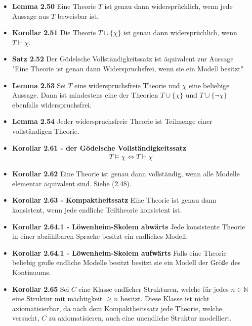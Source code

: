 \documentclass{scrartcl}
\renewcommand{\models}[0]{\vDash}
\begin{document}
\begin{itemize}
    \item \textbf{Lemma 2.50} Eine Theorie $T$ ist genau dann widersprüchlich, wenn jede Aussage aus $T$ beweisbar ist.
    \item \textbf{Korollar 2.51} Die Theorie $T \cup \{\chi\}$ ist genau dann widersprüchlich, wenn $T \vdash \chi$.
    \item \textbf{Satz 2.52} Der Gödelsche Vollständigkeitssatz ist äquivalent zur Aussage "Eine Theorie ist genau dann Widerspruchsfrei, wenn sie ein Modell besitzt"
    \item \textbf{Lemma 2.53} Sei $T$ eine widerspruchsfreie Theorie und $\chi$ eine beliebige Aussage. Dann ist mindestens eine der Theorien $T \cup \{\chi\}$ und $T \cup \{\neg \chi\}$ ebenfalls widerspruchsfrei.
    \item \textbf{Lemma 2.54} Jeder widerspruchsfreie Theorie ist Teilmenge einer vollständigen Theorie.
    \item \textbf{Korollar 2.61 - der Gödelsche Vollständigkeitssatz}
    \begin{align*}
        T \models \chi \Leftrightarrow T \vdash \chi
    \end{align*}
    \item \textbf{Korollar 2.62} Eine Theorie ist genau dann vollständig, wenn alle Modelle elementar äquivalent sind. Siehe (2.48).
    \item \textbf{Korollar 2.63 - Kompaktheitssatz} Eine Theorie ist genau dann konsistent, wenn jede endliche Teiltheorie konsistent ist.
    \item \textbf{Korollar 2.64.1 - Löwenheim-Skolem abwärts} Jede konsistente Theorie in einer abzählbaren Sprache besitzt ein endliches Modell.
    \item \textbf{Korollar 2.64.1 - Löwenheim-Skolem aufwärts} Falls eine Theorie beliebig große endliche Modelle besitzt besitzt sie ein Modell der Größe des Kontinuums.
    \item \textbf{Korollar 2.65} Sei $C$ eine Klasse endlicher Strukturen, welche für jedes $n \in \mathbb{N}$ eine Struktur mit mächtigkeit $\geq n$ besitzt. Diese Klasse ist nicht axiomatisierbar, da nach dem Kompaktheitssatz jede Theorie, welche versucht, $C$ zu axiomatisieren, auch eine unendliche Struktur modelliert.
\end{itemize}
\end{document}
